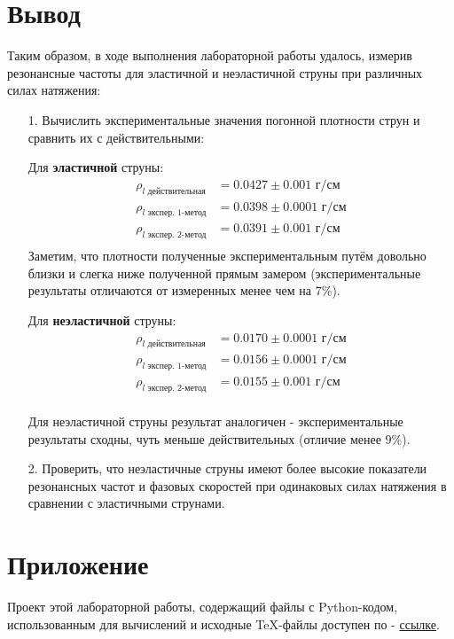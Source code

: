 \documentclass[12pt, a4paper]{article}
\begin{document}
\newpage

\section{Вывод}
Таким образом, в ходе выполнения лабораторной работы удалось, измерив резонансные частоты для эластичной и неэластичной струны при различных силах натяжения:
\begin{itemize}
\item[1.] Вычислить экспериментальные значения погонной плотности струн и сравнить их с действительными:

Для \textbf{эластичной} струны:
\begin{equation*}
\begin{aligned}
\rho_{l \text{ действительная}} &= 0.0427 \pm 0.001 \text{ г/см} \\
\rho_{l \text{ экспер. 1-метод}} &= 0.0398 \pm 0.0001 \text{ г/см} \\
\rho_{l \text{ экспер. 2-метод}} &= 0.0391 \pm 0.001 \text{ г/см} \\
\end{aligned}
\end{equation*}
Заметим, что плотности полученные экспериментальным путём довольно близки и слегка ниже полученной прямым замером (экспериментальные результаты отличаются от измеренных менее чем на $7\%$). 

Для \textbf{неэластичной} струны:
\begin{equation*}
\begin{aligned}
\rho_{l \text{ действительная}} &= 0.0170 \pm 0.0001 \text{ г/см} \\
\rho_{l \text{ экспер. 1-метод}} &= 0.0156 \pm 0.0001 \text{ г/см} \\
\rho_{l \text{ экспер. 2-метод}} &= 0.0155 \pm 0.001 \text{ г/см} \\
\end{aligned}
\end{equation*}

Для неэластичной струны результат аналогичен - экспериментальные результаты сходны, чуть меньше действительных (отличие менее $9\%$).

\item[2.] Проверить, что неэластичные струны имеют более высокие показатели резонансных частот и фазовых скоростей при одинаковых силах натяжения в сравнении с эластичными струнами. 

\end{itemize}


\section{Приложение}
Проект этой лабораторной работы, содержащий файлы с Python-кодом, использованным для вычислений и исходные TeX-файлы доступен по - \href{https://github.com/Dimankarp/Studies/tree/main/LaTeX/Physics%20-%20String%20Oscillations}{ссылке}.
\end{document}
